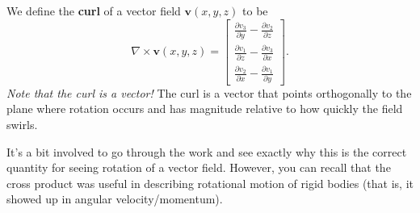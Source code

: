         We define the \textbf{curl} of a vector field $\mathbf{v}(x,y,z)$ to be
        \[
        \nabla \times \mathbf{v}(x,y,z) = \begin{bmatrix} \frac{\partial v_3}{\partial y} - \frac{\partial v_2}{\partial z} \\ \frac{\partial v_1}{\partial z} - \frac{\partial v_3}{\partial x} \\ \frac{\partial v_2}{\partial x} - \frac{\partial v_1}{\partial y} \end{bmatrix}.
        \]
        \emph{Note that the curl is a vector!} The curl is a vector that points orthogonally to the plane where rotation occurs and has magnitude relative to how quickly the field swirls.
        
        It's a bit involved to go through the work and see exactly why this is the correct quantity for seeing rotation of a vector field.  However, you can recall that the cross product was useful in describing rotational motion of rigid bodies (that is, it showed up in angular velocity/momentum).
        
